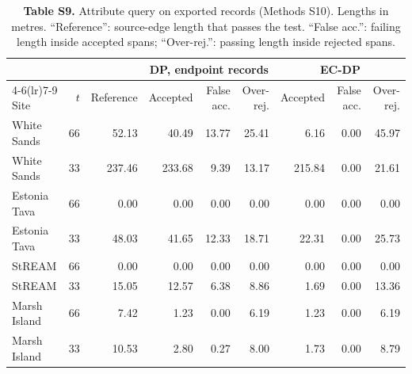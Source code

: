 \documentclass[11pt]{article}
\begin{document}
\begin{table}[!htbp]
\centering
\caption*{\textbf{Table S9.} Attribute query on exported records (Methods S10). Lengths in metres. ``Reference'': source-edge length that passes the test. ``False acc.'': failing length inside accepted spans; ``Over-rej.'': passing length inside rejected spans.}
\vspace{2mm}
\scriptsize
\setlength{\tabcolsep}{4pt}
\begin{tabular}{@{}lrrrrrrrr@{}}
\toprule
 & & & \multicolumn{3}{c}{DP, endpoint records} & \multicolumn{3}{c}{EC-DP} \\
\cmidrule(lr){4-6}\cmidrule(lr){7-9}
Site & $t$ & Reference & Accepted & False acc. & Over-rej. & Accepted & False acc. & Over-rej. \\
\midrule
White Sands & 66 & 52.13 & 40.49 & 13.77 & 25.41 & 6.16 & 0.00 & 45.97 \\
White Sands & 33 & 237.46 & 233.68 & 9.39 & 13.17 & 215.84 & 0.00 & 21.61 \\
Estonia Tava & 66 & 0.00 & 0.00 & 0.00 & 0.00 & 0.00 & 0.00 & 0.00 \\
Estonia Tava & 33 & 48.03 & 41.65 & 12.33 & 18.71 & 22.31 & 0.00 & 25.73 \\
StREAM & 66 & 0.00 & 0.00 & 0.00 & 0.00 & 0.00 & 0.00 & 0.00 \\
StREAM & 33 & 15.05 & 12.57 & 6.38 & 8.86 & 1.69 & 0.00 & 13.36 \\
Marsh Island & 66 & 7.42 & 1.23 & 0.00 & 6.19 & 1.23 & 0.00 & 6.19 \\
Marsh Island & 33 & 10.53 & 2.80 & 0.27 & 8.00 & 1.73 & 0.00 & 8.79 \\
\bottomrule
\end{tabular}
\end{table}
\end{document}
